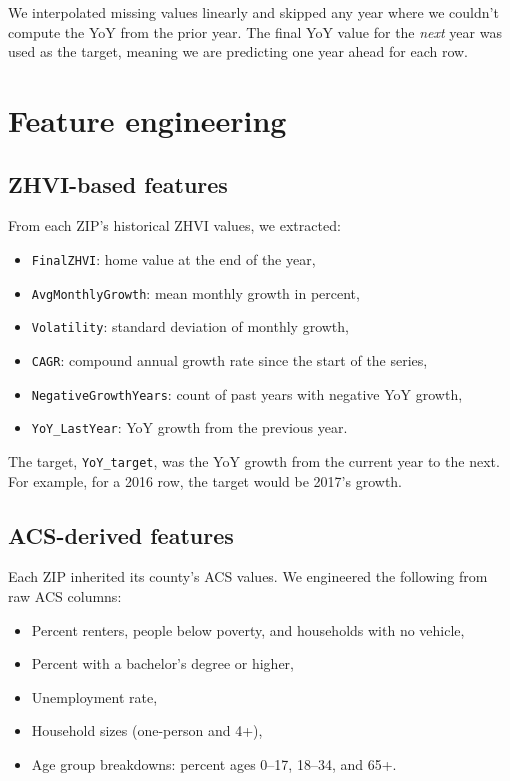 We interpolated missing values linearly and skipped any year where we couldn’t compute the YoY from the prior year. The final YoY value for the \textit{next} year was used as the target, meaning we are predicting one year ahead for each row.

\section{Feature engineering}
\subsection{ZHVI-based features}
From each ZIP’s historical ZHVI values, we extracted:
\begin{itemize}
    \item \texttt{FinalZHVI}: home value at the end of the year,
    \item \texttt{AvgMonthlyGrowth}: mean monthly growth in percent,
    \item \texttt{Volatility}: standard deviation of monthly growth,
    \item \texttt{CAGR}: compound annual growth rate since the start of the series,
    \item \texttt{NegativeGrowthYears}: count of past years with negative YoY growth,
    \item \texttt{YoY\_LastYear}: YoY growth from the previous year.
\end{itemize}

The target, \texttt{YoY\_target}, was the YoY growth from the current year to the next. For example, for a 2016 row, the target would be 2017’s growth.

\subsection{ACS-derived features}
Each ZIP inherited its county's ACS values. We engineered the following from raw ACS columns:
\begin{itemize}
    \item Percent renters, people below poverty, and households with no vehicle,
    \item Percent with a bachelor’s degree or higher,
    \item Unemployment rate,
    \item Household sizes (one-person and 4+),
    \item Age group breakdowns: percent ages 0–17, 18–34, and 65+.
\end{itemize}

